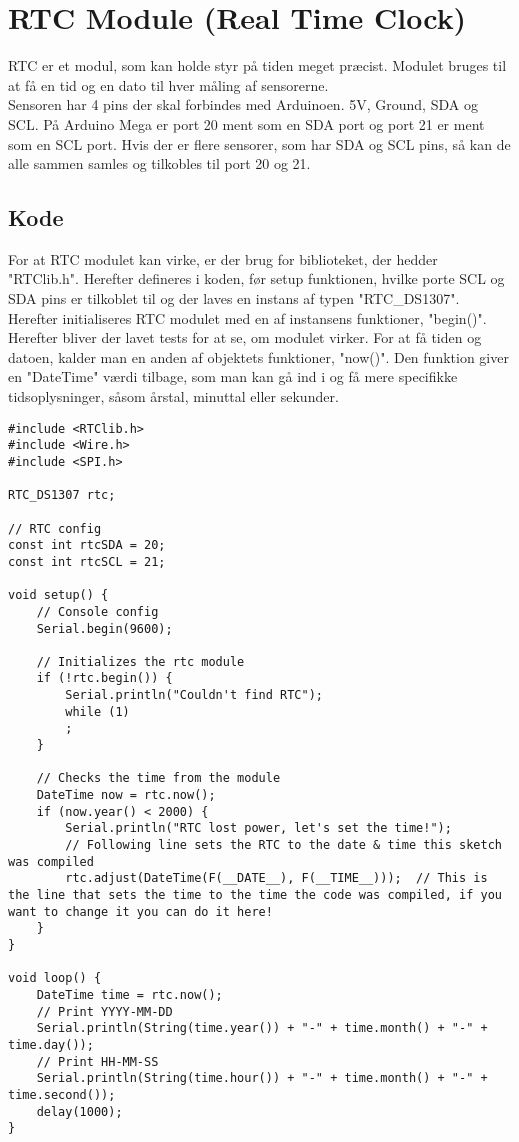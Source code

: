 \section{RTC Module (Real Time Clock)}
	RTC er et modul, som kan holde styr på tiden meget præcist. Modulet bruges til at få en tid og en dato til hver måling af sensorerne. \\ [7pt]
	Sensoren har 4 pins der skal forbindes med Arduinoen. 5V, Ground, SDA og SCL. På Arduino Mega er port 20 ment som en SDA port og port 21 er ment som en SCL port. Hvis der er flere sensorer, som har SDA og SCL pins, så kan de alle sammen samles og tilkobles til port 20 og 21.
	\subsection{Kode}
		For at RTC modulet kan virke, er der brug for biblioteket, der hedder "RTClib.h". Herefter defineres i koden, før setup funktionen, hvilke porte SCL og SDA pins er tilkoblet til og der laves en instans af typen "RTC\_DS1307". Herefter initialiseres RTC modulet med en af instansens funktioner, "begin()". Herefter bliver der lavet tests for at se, om modulet virker. For at få tiden og datoen, kalder man en anden af objektets funktioner, "now()". Den funktion giver en "DateTime"{} værdi tilbage, som man kan gå ind i og få mere specifikke tidsoplysninger, såsom årstal, minuttal eller sekunder.
		
		\begin{lstlisting}
#include <RTClib.h>
#include <Wire.h>
#include <SPI.h>

RTC_DS1307 rtc;

// RTC config
const int rtcSDA = 20;
const int rtcSCL = 21;

void setup() {
	// Console config
	Serial.begin(9600);
	
	// Initializes the rtc module
	if (!rtc.begin()) {
		Serial.println("Couldn't find RTC");
		while (1)
		;
	}
	
	// Checks the time from the module
	DateTime now = rtc.now();
	if (now.year() < 2000) {
		Serial.println("RTC lost power, let's set the time!");
		// Following line sets the RTC to the date & time this sketch was compiled
		rtc.adjust(DateTime(F(__DATE__), F(__TIME__)));  // This is the line that sets the time to the time the code was compiled, if you want to change it you can do it here!
	}
}

void loop() {
	DateTime time = rtc.now();
	// Print YYYY-MM-DD
	Serial.println(String(time.year()) + "-" + time.month() + "-" + time.day());
	// Print HH-MM-SS
	Serial.println(String(time.hour()) + "-" + time.month() + "-" + time.second());
	delay(1000);
}
		\end{lstlisting}